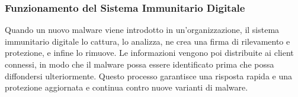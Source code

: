 \subsubsection{Funzionamento del Sistema Immunitario Digitale}

Quando un nuovo malware viene introdotto in un'organizzazione, il sistema immunitario digitale lo cattura, lo analizza, ne crea una firma di rilevamento e protezione, e infine lo rimuove. Le informazioni vengono poi distribuite ai client connessi, in modo che il malware possa essere identificato prima che possa diffondersi ulteriormente. Questo processo garantisce una risposta rapida e una protezione aggiornata e continua contro nuove varianti di malware.